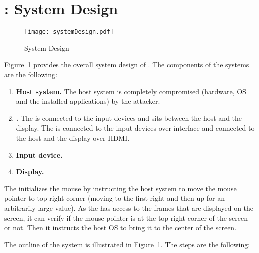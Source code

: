 \section{\name: System Design}
\label{sec:systemDesign}


\begin{figure}
\centering
\texttt{[image: systemDesign.pdf]}
\caption{System Design}
\label{fig:systemDesign}
\centering
\end{figure}


Figure~\ref{fig:systemDesign} provides the overall system design of \name. The components of the systems are the following:

\begin{enumerate}
  \item \textbf{Host system.} The host system is completely compromised (hardware, OS and the installed applications) by the attacker.
  \item \textbf{\device.} The \device is connected to the input devices and sits between the host and the display. The \device is connected to the input devices over \usb interface and connected to the host and the display over HDMI.
  \item \textbf{Input device.}
  \item \textbf{Display.}
  
\end{enumerate}

 The \device initializes the mouse by instructing the host system to move the mouse pointer to top right corner (moving to the first right and then up for an arbitrarily large value). As the \device has access to the frames that are displayed on the screen, it can verify if the mouse pointer is at the top-right corner of the screen or not. Then it instructs the host OS to bring it to the center of the screen.

The outline of the system is illustrated in Figure~\ref{fig:systemDesign}. The steps are the following:


